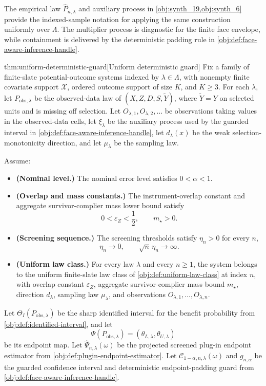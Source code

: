 The empirical law \(\widehat P_{n,\lambda}\) and auxiliary process in \cref{obj:synth_19,obj:synth_6} provide the indexed-sample notation for applying the same construction uniformly over \(\Lambda\).  The multiplier process is diagnostic for the finite face envelope, while containment is delivered by the deterministic padding rule in \cref{obj:def:face-aware-inference-handle}.

\begin{theoremv}{thm:uniform-deterministic-guard}[Uniform deterministic guard]
Fix a family of finite-slate potential-outcome systems indexed by \(\lambda\in\Lambda\), with nonempty finite covariate support \(\mathcal X\), ordered outcome support of size \(K\), and \(K\ge 3\).  For each \(\lambda\), let \(P_{\mathrm{obs},\lambda}\) be the observed-data law of \((X,Z,D,S,\widetilde Y)\), where \(\widetilde Y=Y\) on selected units and is missing off selection.  Let \(O_{\lambda,1},O_{\lambda,2},\ldots\) be observations taking values in the observed-data cells, let \(\xi_\lambda\) be the auxiliary process used by the guarded interval in \cref{obj:def:face-aware-inference-handle}, let \(d_\lambda(x)\) be the weak selection-monotonicity direction, and let \(\mu_\lambda\) be the sampling law.

Assume:
\begin{itemize}
\item \textbf{(Nominal level.)} The nominal error level satisfies \(0<\alpha<1\).
\item \textbf{(Overlap and mass constants.)} The instrument-overlap constant and aggregate survivor-complier mass lower bound satisfy
\[
0<\varepsilon_Z<\frac12,
\qquad
m_{\star}>0 .
\]
\item \textbf{(Screening sequence.)} The screening thresholds satisfy \(\eta_n>0\) for every \(n\),
\[
\eta_n\to 0,
\qquad
\sqrt n\,\eta_n\to\infty .
\]
\item \textbf{(Uniform law class.)} For every law \(\lambda\) and every \(n\ge 1\), the system belongs to the uniform finite-slate law class of \cref{obj:def:uniform-law-class} at index \(n\), with overlap constant \(\varepsilon_Z\), aggregate survivor-complier mass bound \(m_{\star}\), direction \(d_\lambda\), sampling law \(\mu_\lambda\), and observations \(O_{\lambda,1},\ldots,O_{\lambda,n}\).
\end{itemize}

Let \(\Theta_I(P_{\mathrm{obs},\lambda})\) be the sharp identified interval for the benefit probability from \cref{obj:def:identified-interval}, and let
\[
\Psi(P_{\mathrm{obs},\lambda})
=
(\theta_{L,\lambda},\theta_{U,\lambda})
\]
be its endpoint map.  Let \(\widehat\Psi_{n,\lambda}(\omega)\) be the projected screened plug-in endpoint estimator from \cref{obj:def:plugin-endpoint-estimator}.  Let \(\mathcal C_{1-\alpha,n,\lambda}(\omega)\) and \(g_{n,\alpha}\) be the guarded confidence interval and deterministic endpoint-padding guard from \cref{obj:def:face-aware-inference-handle}.


\end{theoremv}
